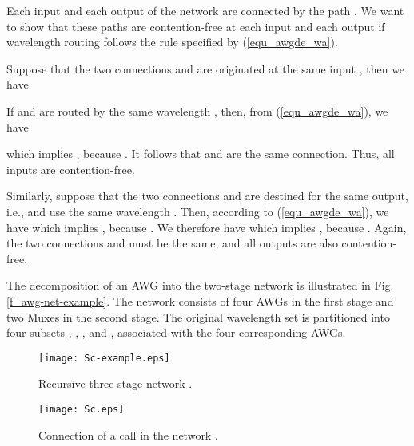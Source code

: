 \documentclass[journal]{IEEEtran}
\begin{document}
\begin{IEEEproof}
Each input  and each output  of the network
 are connected by the path
. We want to show that these paths are
contention-free at each input and each output if wavelength routing
follows the rule specified by (\ref{equ_awgde_wa}).

Suppose that the two connections  and
 are originated at the same input
, then we have

If  and  are routed by the same wavelength
, then, from (\ref{equ_awgde_wa}), we have

which implies , because
. It follows that  and 
are the same connection. Thus, all inputs are contention-free.

Similarly, suppose that the two connections 
and  are destined for the same output, i.e.,
 and use the same wavelength
. Then, according to (\ref{equ_awgde_wa}), we
have  which implies
, because .
We therefore have  which implies
, because . Again, the two
connections  and  must be the same, and all outputs are
also contention-free.
\end{IEEEproof}

The decomposition of an  AWG into the two-stage network
 is illustrated in Fig. \ref{f_awg-net-example}.
The network  consists of four  AWGs in
the first stage and two  Muxes in the second stage. The
original wavelength set  is
partitioned into four subsets ,
,
, and
, associated with the four
corresponding  AWGs.

\begin{figure*}[t]
\centering
\texttt{[image: Sc-example.eps]}
\caption{Recursive three-stage network
.}\label{f_Sc-example}
\end{figure*}

\begin{figure*}[t]
\centering
\texttt{[image: Sc.eps]}
\caption{Connection of a call 
in the network .}\label{f_Sc}
\end{figure*}
\end{document}
